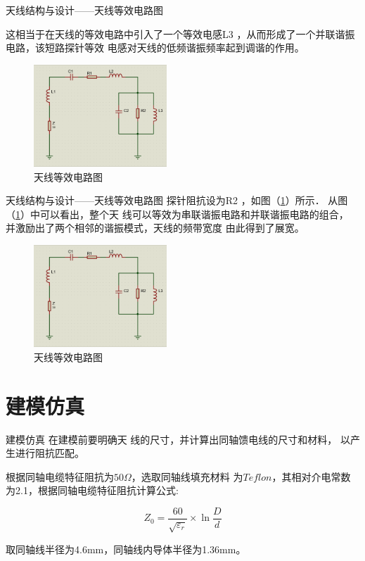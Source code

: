 \documentclass[10pt]{beamer}
\begin{document}
\begin{frame}{天线结构与设计——{\normalsize 天线等效电路图}}

	\qquad 这相当于在天线的等效电路中引入了一个等效电感L3
	，从而形成了一个并联谐振电路，该短路探针等效
	电感对天线的低频谐振频率起到调谐的作用。
	\begin{figure}[htbp]
		\centering
		\includegraphics[width=5cm]{figs/f2.png}
		\caption{天线等效电路图 }
	\end{figure}
\end{frame}


\begin{frame}{天线结构与设计——{\normalsize 天线等效电路图}}
	\qquad 探针阻抗设为R2
	，如图（\ref{f222}）所示． 从图（\ref{f222}）中可以看出，整个天
	线可以等效为串联谐振电路和并联谐振电路的组合，
	并激励出了两个相邻的谐振模式，天线的频带宽度
	由此得到了展宽。
	\begin{figure}[htbp]
		\centering
		\includegraphics[width=5cm]{figs/f2.png}
		\caption{天线等效电路图 }
		\label{f222}
	\end{figure}
\end{frame}


\section{建模仿真}
\begin{frame}{建模仿真}
	\qquad 在建模前要明确天
线的尺寸，并计算出同轴馈电线的尺寸和材料，
以产生进行阻抗匹配。\pause

\qquad 根据同轴电缆特征阻抗为$50\Omega$，选取同轴线填充材料
为$Teflon$，其相对介电常数为2.1，根据同轴电缆特征阻抗计算公式:
\begin{theorem}
$$Z_0=\frac{60}{\sqrt{\varepsilon_r}}\times\ln\frac{D}{d}
$$
\end{theorem}
取同轴线半径为4.6mm，同轴线内导体半径为1.36mm。
\end{frame}
\end{document}
